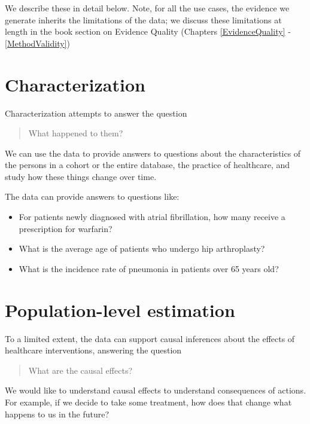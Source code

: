 \documentclass[11pt]{book}
\providecommand{\tightlist}{%
  \setlength{\itemsep}{0pt}\setlength{\parskip}{0pt}}
\theoremstyle{definition}
\theoremstyle{definition}
\theoremstyle{definition}
\theoremstyle{remark}
\begin{document}
We describe these in detail below. Note, for all the use cases, the evidence we generate inherits the limitations of the data; we discuss these limitations at length in the book section on Evidence Quality (Chapters \ref{EvidenceQuality} - \ref{MethodValidity})

\hypertarget{characterization}{%
\section{Characterization}\label{characterization}}

Characterization attempts to answer the question

\begin{quote}
What happened to them?
\end{quote}

We can use the data to provide answers to questions about the characteristics of the persons in a cohort or the entire database, the practice of healthcare, and study how these things change over time.

The data can provide answers to questions like:

\begin{itemize}
\tightlist
\item
  For patients newly diagnosed with atrial fibrillation, how many receive a prescription for warfarin?
\item
  What is the average age of patients who undergo hip arthroplasty?
\item
  What is the incidence rate of pneumonia in patients over 65 years old?
\end{itemize}

\hypertarget{population-level-estimation}{%
\section{Population-level estimation}\label{population-level-estimation}}

To a limited extent, the data can support causal inferences about the effects of healthcare interventions, answering the question

\begin{quote}
What are the causal effects?
\end{quote}

We would like to understand causal effects to understand consequences of actions. For example, if we decide to take some treatment, how does that change what happens to us in the future?
\end{document}
